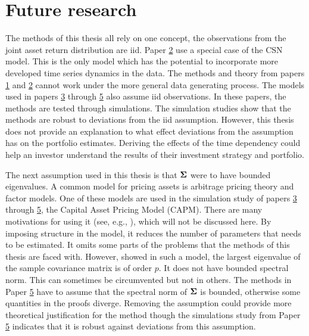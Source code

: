 \documentclass[12pt, oneside]{book}\usepackage{knitr}
\begin{document}
\chapter{Future research}\label{ch:future}


The methods of this thesis all rely on one concept, the observations from the joint asset return distribution are iid.
Paper \hyperref[sec:paper2]{2} use a special case of the CSN model.
This is the only model which has the potential to incorporate more developed time series dynamics in the data.
The methods and theory from papers \hyperref[sec:paper1]{1} and \hyperref[sec:paper2]{2} cannot work under the more general data generating process.
The models used in papers \hyperref[sec:paper3]{3} through \hyperref[sec:paper5]{5} also assume iid observations.
In these papers, the methods are tested through simulations.
The simulation studies show that the methods are robust to deviations from the iid assumption.
However, this thesis does not provide an explanation to what effect deviations from the assumption has on the portfolio estimates.
Deriving the effects of the time dependency could help an investor understand the results of their investment strategy and portfolio.

The next assumption used in this thesis is that $\mathbf{\Sigma}$ were to have bounded eigenvalues.
A common model for pricing assets is arbitrage pricing theory and factor models. 
One of these models are used in the simulation study of papers \hyperref[sec:paper3]{3} through \hyperref[sec:paper5]{5}, the Capital Asset Pricing Model (CAPM).
There are many motivations for using it (see, e.g., \citet{ross2013arbitrage}), which will not be discussed here.
By imposing structure in the model, it reduces the number of parameters that needs to be estimated.
It omits some parts of the problems that the methods of this thesis are faced with.
However, \citet{fan2013large} showed in such a model, the largest eigenvalue of the sample covariance matrix is of order $p$.
It does not have bounded spectral norm.
This can sometimes be circumvented but not in others.
The methods in Paper \hyperref[sec:paper5]{5} have to assume that the spectral norm of $\mathbf{\Sigma}$ is bounded, otherwise some quantities in the proofs diverge.
Removing the assumption could provide more theoretical justification for the method though the simulations study from Paper \hyperref[sec:paper5]{5} indicates that it is robust against deviations from this assumption.
\end{document}
